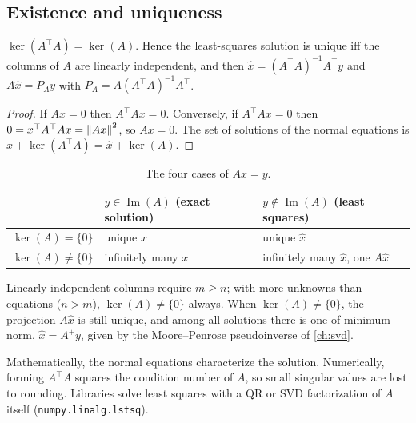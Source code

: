 \begin{notechapter}
\subsection{Existence and uniqueness}

\begin{proposition}\label{adjoint-operator:prop:unique}
$\ker(A^\top A) = \ker(A)$. Hence the least-squares solution is unique iff the columns
of $A$ are linearly independent, and then $\hat x = (A^\top A)^{-1}A^\top y$ and
$A\hat x = P_Ay$ with $P_A = A(A^\top A)^{-1}A^\top$.
\end{proposition}

\begin{proof}
If $Ax = 0$ then $A^\top Ax = 0$. Conversely, if $A^\top Ax = 0$ then
$0 = x^\top A^\top Ax = \left\|Ax\right\|^2$, so $Ax = 0$. The set of solutions of the normal
equations is $\hat x + \ker(A^\top A) = \hat x + \ker(A)$.
\end{proof}

\begin{table}[ht]
\centering
\caption{The four cases of $Ax = y$.}
\label{adjoint-operator:tab:cases}
\begin{tabular}{@{}lll@{}}
\toprule
 & $y\in\operatorname{Im}(A)$ (exact solution) & $y\notin\operatorname{Im}(A)$ (least squares) \\
\midrule
$\ker(A) = \{0\}$ & unique $x$ & unique $\hat x$ \\
$\ker(A)\neq\{0\}$ & infinitely many $x$ & infinitely many $\hat x$, one $A\hat x$ \\
\bottomrule
\end{tabular}
\end{table}

Linearly independent columns require $m\geq n$; with more unknowns than equations
($n>m$), $\ker(A)\neq\{0\}$ always. When $\ker(A)\neq\{0\}$, the projection $A\hat x$ is still
unique, and among all solutions there is one of minimum norm, $\hat x = A^+y$, given by
the Moore--Penrose pseudoinverse of \cref{ch:svd}.

\begin{pitfall}
Mathematically, the normal equations characterize the solution. Numerically,
forming $A^\top A$ squares the condition number of $A$, so small singular values are
lost to rounding. Libraries solve least squares with a QR or SVD factorization of $A$
itself (\texttt{numpy.linalg.lstsq}).
\end{pitfall}


\end{notechapter}
